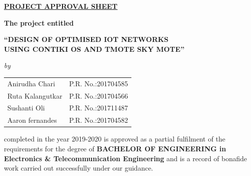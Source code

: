 \begin{center}
%
\underline{\bfseries \huge PROJECT APPROVAL SHEET}\\
\vspace{0.4cm}
\begin{figure}[H]
{\centering {}\par}
\end{figure}
\vspace{-0.6cm}
{\bfseries The project entitled}\\
\vspace{0.2cm}
\begin{large}
{\bfseries ``DESIGN OF OPTIMISED IOT NETWORKS\\USING CONTIKI OS AND TMOTE SKY MOTE''}\\
\end{large}
\vspace{0.1cm}
\begin{small}
\emph{by}\\
\end{small}
\vspace{0.1cm}
\begin{table}[H]
\normalsize
\bfseries
\begin{center}
\begin{tabular}{ll}
Anirudha Chari \hspace{1cm} & P.R. No.:201704585\\
Ruta Kalangutkar & P.R. No.:201704566\\
Sushanti Oli & P.R. No.:201711487\\
Aaron fernandes & P.R. No.:201704582\\
\end{tabular}
\end{center}
\end{table}
\vspace{-1.6cm}
\end{center}
\noindent completed in the year 2019-2020 is approved as a partial fulfilment of the requirements for the degree of {\bfseries BACHELOR OF ENGINEERING in Electronics \& Telecommunication Engineering} and is a record of bonafide work carried out successfully under our guidance.\\




